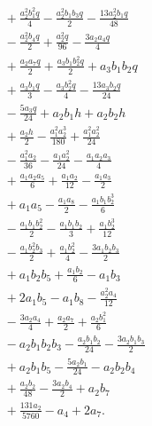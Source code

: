 \begin{align*}
&{}+ \frac{a_{2}^{2} b_{1}^{2} q}{4} - \frac{a_{2}^{2} b_{1} b_{3} q}{2} - \frac{13 a_{2}^{2} b_{1} q}{48}\\
&{}- \frac{a_{2}^{2} b_{4} q}{2} + \frac{a_{2}^{2} q}{96} - \frac{3 a_{2} a_{4} q}{4}\\
&{}+ \frac{a_{2} a_{7} q}{2} + \frac{a_{3} b_{1} b_{2}^{2} q}{2} + a_{3} b_{1} b_{2} q\\
&{}+ \frac{a_{3} b_{1} q}{3} - \frac{a_{3} b_{2}^{2} q}{4} - \frac{13 a_{3} b_{2} q}{24}\\
&{}- \frac{5 a_{3} q}{24} + a_{2} b_{1} h + a_{2} b_{2} h\\
&{}+ \frac{a_{2} h}{2} - \frac{a_{1}^{2} a_{2}^{3}}{180} + \frac{a_{1}^{2} a_{2}^{2}}{24}\\
&{}- \frac{a_{1}^{2} a_{2}}{36} - \frac{a_{1} a_{2}^{2}}{24} - \frac{a_{1} a_{2} a_{3}}{4}\\
&{}+ \frac{a_{1} a_{2} a_{5}}{6} + \frac{a_{1} a_{2}}{12} - \frac{a_{1} a_{3}}{2}\\
&{}+ a_{1} a_{5} - \frac{a_{1} a_{8}}{2} - \frac{a_{1} b_{1} b_{2}^{3}}{6}\\
&{}- \frac{a_{1} b_{1} b_{2}^{2}}{2} - \frac{a_{1} b_{1} b_{2}}{3} + \frac{a_{1} b_{2}^{3}}{12}\\
&{}- \frac{a_{1} b_{2}^{2} b_{3}}{2} + \frac{a_{1} b_{2}^{2}}{4} - \frac{3 a_{1} b_{2} b_{3}}{2}\\
&{}+ a_{1} b_{2} b_{5} + \frac{a_{1} b_{2}}{6} - a_{1} b_{3}\\
&{}+ 2 a_{1} b_{5} - a_{1} b_{8} - \frac{a_{2}^{2} a_{4}}{12}\\
&{}- \frac{3 a_{2} a_{4}}{4} + \frac{a_{2} a_{7}}{2} + \frac{a_{2} b_{1}^{2}}{6}\\
&{}- a_{2} b_{1} b_{2} b_{3} - \frac{a_{2} b_{1} b_{2}}{24} - \frac{3 a_{2} b_{1} b_{3}}{2}\\
&{}+ a_{2} b_{1} b_{5} - \frac{5 a_{2} b_{1}}{24} - a_{2} b_{2} b_{4}\\
&{}+ \frac{a_{2} b_{2}}{48} - \frac{3 a_{2} b_{4}}{2} + a_{2} b_{7}\\
&{}+ \frac{131 a_{2}}{5760} - a_{4} + 2 a_{7}.
\end{align*}
